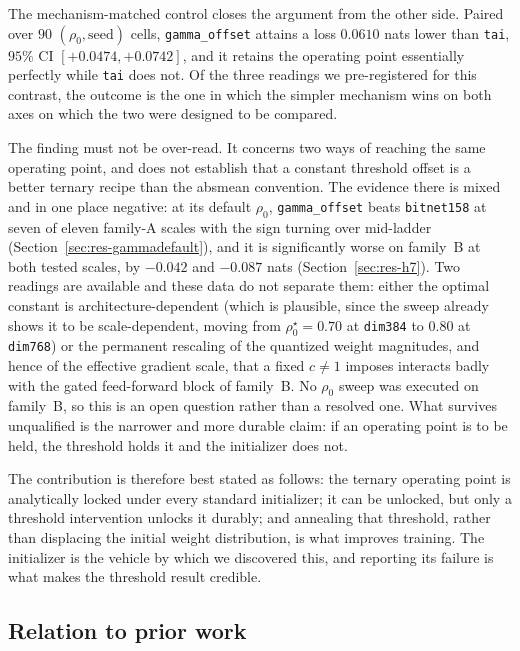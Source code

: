 \documentclass[final,5p,times,twocolumn]{elsarticle}
\theoremstyle{remark}
\newcommand{\rhoz}{\rho_{0}}
\begin{document}
The mechanism-matched control closes the argument from the other side. Paired
over $90$ $(\rhoz, \mathrm{seed})$ cells, \texttt{gamma\_offset} attains a loss
$0.0610$ nats lower than \texttt{tai}, $95\%$ CI $[+0.0474, +0.0742]$, and it
retains the operating point essentially perfectly while \texttt{tai} does not.
Of the three readings we pre-registered for this contrast, the outcome is the
one in which the simpler mechanism wins on both axes on which the two were
designed to be compared.

The finding must not be over-read. It concerns two ways of reaching the
same operating point, and does not establish that a
constant threshold offset is a better ternary recipe than the absmean
convention. The evidence there is mixed and in one place negative: at its
default $\rhoz$, \texttt{gamma\_offset} beats \texttt{bitnet158} at seven of
eleven family-A scales with the sign turning over mid-ladder
(Section~\ref{sec:res-gammadefault}), and it is significantly worse on family~B
at both tested scales, by $-0.042$ and $-0.087$ nats
(Section~\ref{sec:res-h7}). Two readings are available and these data do not
separate them: either the optimal constant is architecture-dependent (which is
plausible, since the sweep already shows it to be scale-dependent, moving from
$\rhoz^{\star} = 0.70$ at \texttt{dim384} to $0.80$ at \texttt{dim768}) or the
permanent rescaling of the quantized weight magnitudes, and hence of the
effective gradient scale, that a fixed $c \neq 1$
imposes interacts badly with the gated feed-forward block of family~B. No
$\rhoz$ sweep was executed on family~B, so this is an open question rather than
a resolved one. What survives unqualified is the narrower and more durable
claim: if an operating point is to be held, the threshold holds it and
the initializer does not.

The contribution is therefore best stated as follows: the ternary
operating point is analytically locked under every standard initializer; it can
be unlocked, but only a threshold intervention unlocks it durably; and
annealing that threshold, rather than displacing the initial weight
distribution, is what improves training. The initializer is the vehicle by
which we discovered this, and reporting its failure is what makes the
threshold result credible.

\subsection{Relation to prior work}
\label{sec:disc-prior}
\end{document}
